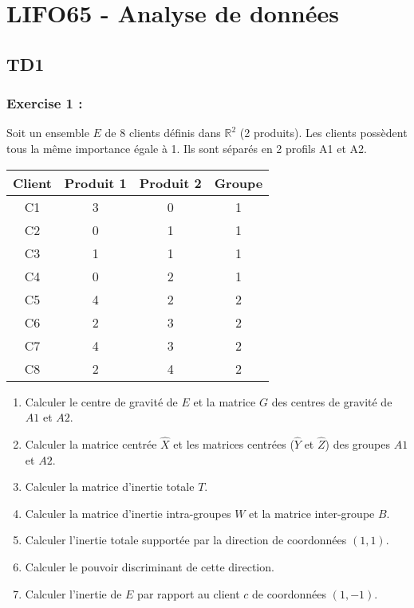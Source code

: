 \documentclass{article}
\begin{document}
\section*{LIFO65 - Analyse de données}
\subsection*{TD1}
\subsubsection*{Exercise 1 :}
Soit un ensemble $E$ de 8 clients définis dans $\mathbb{R}^2$ (2 produits). Les clients possèdent tous la même importance égale à 1. Ils sont séparés en 2 profils A1 et A2.

\begin{center}
    \begin{tabular}{|c|c|c|c|}
    \hline
    Client & Produit 1 & Produit 2 & Groupe \\
    \hline
    C1 & 3 & 0 & 1 \\
    C2 & 0 & 1 & 1 \\
    C3 & 1 & 1 & 1 \\
    C4 & 0 & 2 & 1 \\
    C5 & 4 & 2 & 2 \\
    C6 & 2 & 3 & 2 \\
    C7 & 4 & 3 & 2 \\
    C8 & 2 & 4 & 2 \\
    \hline
    \end{tabular}
\end{center}

\begin{enumerate}
    \item Calculer le centre de gravité de $E$ et la matrice $G$ des centres de gravité de $A1$ et $A2$.
    \item Calculer la matrice centrée $\hat{X}$ et les matrices centrées ($\hat{Y}$ et $\hat{Z}$) des groupes $A1$ et $A2$.
    \item Calculer la matrice d’inertie totale $T$.
    \item Calculer la matrice d’inertie intra-groupes $W$ et la matrice inter-groupe $B$.
    \item Calculer l’inertie totale supportée par la direction de coordonnées $(1, 1)$.
    \item Calculer le pouvoir discriminant de cette direction.
    \item Calculer l’inertie de $E$ par rapport au client $c$ de coordonnées $(1, -1)$.
\end{enumerate}
\end{document}
